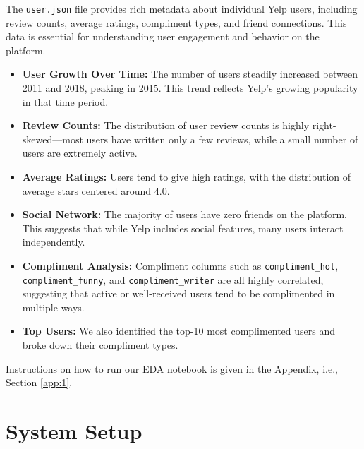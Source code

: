 \documentclass[conference]{IEEEtran}
\begin{document}
The \texttt{user.json} file provides rich metadata about individual Yelp users,
including review counts, average ratings, compliment types, and friend connections.
This data is essential for understanding user engagement and behavior on the
platform.
\begin{itemize}
    \item \textbf{User Growth Over Time:} The number of users steadily increased
    between 2011 and 2018, peaking in 2015. This trend reflects Yelp's growing
    popularity in that time period.
    \item \textbf{Review Counts:} The distribution of user review counts is highly
    right-skewed---most users have written only a few reviews, while a small number
    of users are extremely active.
    \item \textbf{Average Ratings:} Users tend to give high ratings, with the
    distribution of average stars centered around 4.0.
    \item \textbf{Social Network:} The majority of users have zero friends on the
    platform. This suggests that while Yelp includes social features, many users
    interact independently.
    \item \textbf{Compliment Analysis:} Compliment columns such as \texttt{compliment\_hot},
    \texttt{compliment\_funny}, and \texttt{compliment\_writer} are all highly
    correlated, suggesting that active or well-received users tend to be
    complimented in multiple ways.
    \item \textbf{Top Users:} We also identified the top-10 most complimented users
    and broke down their compliment types.
\end{itemize}

Instructions on how to run our EDA notebook is given in the Appendix, i.e.,
Section \ref{app:1}.

\section{System Setup}
\end{document}
